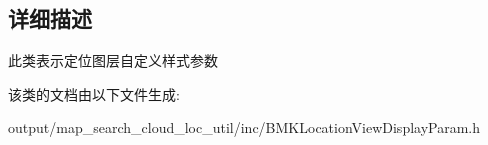 \subsection{详细描述}
此类表示定位图层自定义样式参数 

该类的文档由以下文件生成\+:\begin{DoxyCompactItemize}
\item 
output/map\+\_\+search\+\_\+cloud\+\_\+loc\+\_\+util/inc/B\+M\+K\+Location\+View\+Display\+Param.\+h\end{DoxyCompactItemize}
